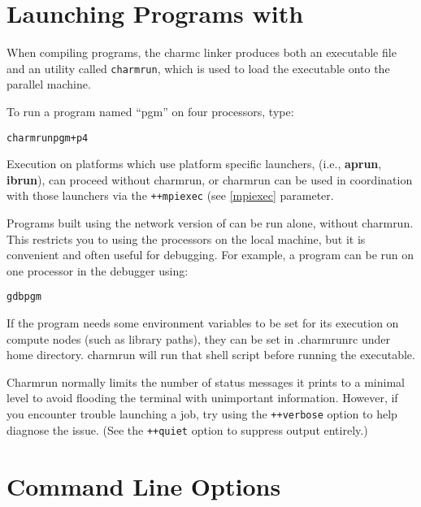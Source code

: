 \section{Launching Programs with }
\label{charmrun}

When compiling \charmpp{} programs, the charmc linker produces
both an executable file and an utility called {\tt charmrun},
which is used to load the executable onto the parallel machine.

To run a \charmpp{} program named ``pgm'' on four processors, type:
\begin{alltt}
charmrun pgm +p4
\end{alltt}

Execution on platforms which use platform specific launchers, (i.e.,
{\bf aprun}, {\bf ibrun}), can proceed without charmrun, or charmrun can be used
in coordination with those launchers via the {\tt ++mpiexec} (see
\ref{mpiexec} parameter.

Programs built using the network version of \charmpp{} can be run
alone, without charmrun.  This restricts you to using the processors
on the local machine, but it is convenient and often useful for
debugging.  For example, a \charmpp{} program can be run on one
processor in the debugger using:

\begin{alltt}
gdb pgm
\end{alltt}

If the program needs some environment variables
to be set for its execution on compute nodes
(such as library paths), they can be set in
.charmrunrc under home directory. charmrun
will run that shell script before running the executable.

Charmrun normally limits the number of status messages it prints to a minimal
level to avoid flooding the terminal with unimportant information. However, if
you encounter trouble launching a job, try using the {\tt ++verbose} option to
help diagnose the issue. (See the {\tt ++quiet} option to suppress output
entirely.)

\section[Command Line Options]{Command Line Options}
\label{command line options}

